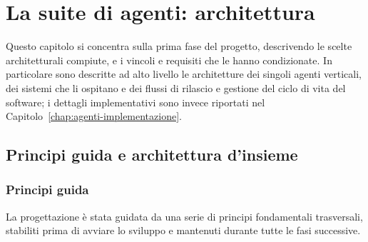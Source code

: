 
\chapter{La suite di agenti: architettura}
\label{chap:agenti-architettura}

Questo capitolo si concentra sulla prima fase del progetto, descrivendo le scelte architetturali compiute, e i vincoli e requisiti 
che le hanno condizionate.
In particolare sono descritte ad alto livello le architetture dei singoli agenti verticali, dei sistemi che li ospitano e dei
flussi di rilascio e gestione del ciclo di vita del software;
i dettagli implementativi sono invece riportati nel Capitolo~\ref{chap:agenti-implementazione}.

\section{Principi guida e architettura d'insieme}
\label{sec:agenti-principi}

\subsection{Principi guida}
\label{subsec:agenti-principi-guida}

La progettazione è stata guidata da una serie di principi fondamentali trasversali,
stabiliti prima di avviare lo sviluppo e mantenuti durante tutte le fasi successive.

